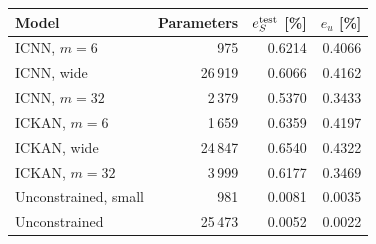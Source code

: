 \begin{tabular}{lrrr}
\toprule
Model & Parameters & $e_S^{\rm test}$ [\%] & $e_u$ [\%] \\
\midrule
ICNN, $m=6$ & 975 & 0.6214 & 0.4066 \\
ICNN, wide & 26\,919 & 0.6066 & 0.4162 \\
ICNN, $m=32$ & 2\,379 & 0.5370 & 0.3433 \\
ICKAN, $m=6$ & 1\,659 & 0.6359 & 0.4197 \\
ICKAN, wide & 24\,847 & 0.6540 & 0.4322 \\
ICKAN, $m=32$ & 3\,999 & 0.6177 & 0.3469 \\
Unconstrained, small & 981 & 0.0081 & 0.0035 \\
Unconstrained & 25\,473 & 0.0052 & 0.0022 \\
\bottomrule
\end{tabular}

\par{}
